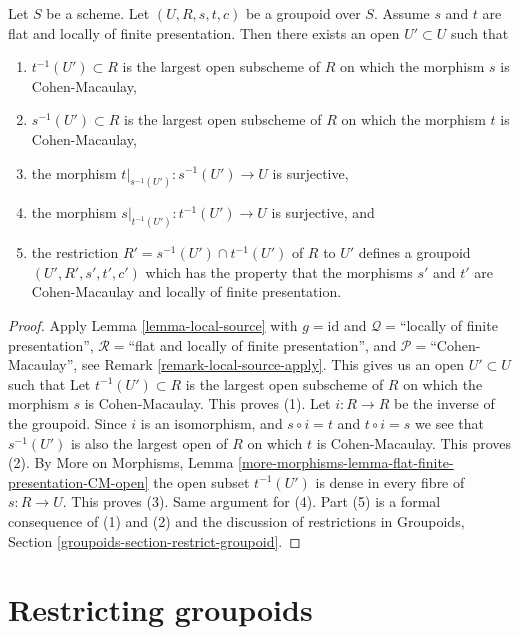\begin{lemma}
\label{lemma-make-CM}
Let $S$ be a scheme.
Let $(U, R, s, t, c)$ be a groupoid over $S$.
Assume $s$ and $t$ are flat and locally of finite presentation.
Then there exists an open $U' \subset U$ such that
\begin{enumerate}
\item $t^{-1}(U') \subset R$ is the largest open subscheme of
$R$ on which the morphism $s$ is Cohen-Macaulay,
\item $s^{-1}(U') \subset R$ is the largest open subscheme of
$R$ on which the morphism $t$ is Cohen-Macaulay,
\item the morphism $t|_{s^{-1}(U')} : s^{-1}(U') \to U$ is
surjective,
\item the morphism $s|_{t^{-1}(U')} : t^{-1}(U') \to U$ is
surjective, and
\item the restriction $R' = s^{-1}(U') \cap t^{-1}(U')$
of $R$ to $U'$ defines a groupoid $(U', R', s', t', c')$ which has the property
that the morphisms $s'$ and $t'$ are Cohen-Macaulay and locally of
finite presentation.
\end{enumerate}
\end{lemma}

\begin{proof}
Apply
Lemma \ref{lemma-local-source}
with
$g = \text{id}$ and
$\mathcal{Q} =$``locally of finite presentation'',
$\mathcal{R} =$``flat and locally of finite presentation'', and
$\mathcal{P}=$``Cohen-Macaulay'', see
Remark \ref{remark-local-source-apply}.
This gives us an open $U' \subset U$ such that
Let $t^{-1}(U') \subset R$ is the largest open subscheme of $R$
on which the morphism $s$ is Cohen-Macaulay.
This proves (1).
Let $i : R \to R$ be the inverse of the groupoid.
Since $i$ is an isomorphism, and $s \circ i = t$ and $t \circ i = s$
we see that $s^{-1}(U')$ is also the largest open of $R$ on which $t$ is
Cohen-Macaulay. This proves (2).
By
More on Morphisms,
Lemma \ref{more-morphisms-lemma-flat-finite-presentation-CM-open}
the open subset $t^{-1}(U')$ is dense in every fibre of $s : R \to U$.
This proves (3). Same argument for (4).
Part (5) is a formal consequence of (1) and (2) and the discussion
of restrictions in
Groupoids, Section \ref{groupoids-section-restrict-groupoid}.
\end{proof}








\section{Restricting groupoids}
\label{section-restricting-groupoids}

